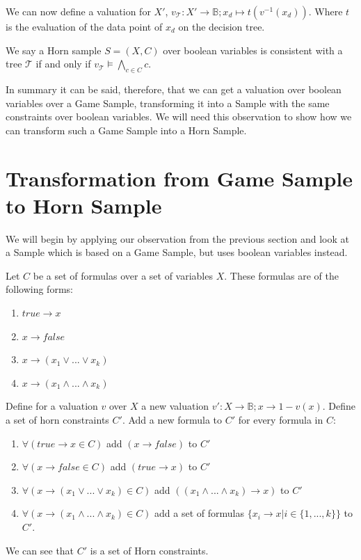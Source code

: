 \documentclass[10pt,a4paper]{article}
\theoremstyle{plain}
\theoremstyle{definition}
\begin{document}
We can now define a valuation for $X'$, $v_\mathcal{T}: X' \to \mathbb{B};x_d \mapsto t(v^{-1}(x_{d}))$. Where $t$ is the evaluation of the data point of $x_d$ on the decision tree.

 We say a Horn sample $S = (X,C)$ over boolean variables is consistent with a tree $\mathcal{T}$ if and only if $v_{\mathcal{T}} \vDash \bigwedge_{c \in C} c$.

In summary it can be said, therefore, that we can get a valuation over boolean variables over a Game Sample, transforming it into a Sample with the same constraints over boolean variables. We will need this observation to show how we can transform such a Game Sample into a Horn Sample.

\newpage

\section{Transformation from Game Sample to Horn Sample} \label{transformation}
We will begin by applying our observation from the previous section and look at a  Sample which is based on a Game Sample, but uses boolean variables instead.

Let $C$ be a set of formulas over a set of variables $X$. These formulas are of the following forms:
\begin{enumerate}
\item $true \to x$
\item $x \to false$
\item $ x \to (x_1 \vee  ... \vee x_k)$
\item $ x\to (x_1 \wedge ... \wedge x_k)$
\end{enumerate}

Define for a valuation $v$ over $X$ a new valuation $v': X \to \mathbb{B}; x \to 1-v(x)$.
Define a set of horn constraints $C'$. Add a new formula to $C'$ for every formula in $C$:
\begin{enumerate}
\item $\forall (true \to x\in C)$ add $(x \to false)$ to $C'$
\item $\forall (x \to false\in C)$ add $(true \to x)$ to $C'$
\item $\forall (x \to (x_1 \vee  ... \vee x_k)\in C)$ add $ ((x_1 \wedge...\wedge x_k) \to x)$ to $C'$
\item $\forall (x \to (x_1 \wedge ... \wedge x_k)\in C)$ add a set of formulas $\{x_i \to x | i \in \{1,...,k\}\}$ to $C'$.
\end{enumerate}
We can  see that $C'$ is a set of Horn constraints.
\end{document}
